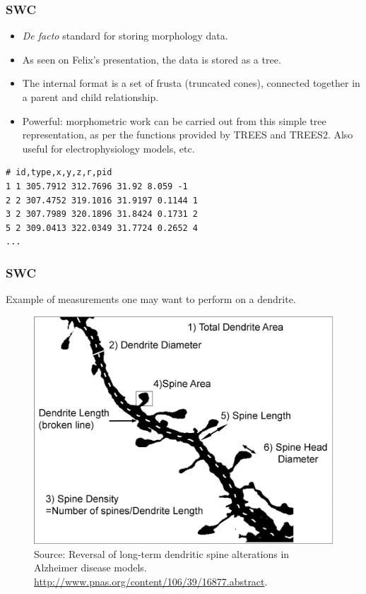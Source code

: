 \documentclass{beamer}
\begin{document}
\begin{frame}[fragile]
\frametitle{SWC}

\begin{itemize}

\item \emph{De facto} standard for storing morphology data.
\pause
\item As seen on Felix's presentation, the data is stored as a tree.
\pause
\item The internal format is a set of frusta (truncated cones),
  connected together in a parent and child relationship.
\pause
\item Powerful: morphometric work can be carried out from this simple
  tree representation, as per the functions provided by TREES and
  TREES2. Also useful for electrophysiology models, etc.
\pause
\end{itemize}

\begin{verbatim}
# id,type,x,y,z,r,pid
1 1 305.7912 312.7696 31.92 8.059 -1
2 2 307.4752 319.1016 31.9197 0.1144 1
3 2 307.7989 320.1896 31.8424 0.1731 2
5 2 309.0413 322.0349 31.7724 0.2652 4
...
\end{verbatim}
\end{frame}

\begin{frame}
\frametitle{SWC}

Example of measurements one may want to perform on a dendrite.

\begin{figure}[H]
    \centering
    \includegraphics[scale=0.1]{../blog/images/F1_large}
    \caption{Source: Reversal of long-term dendritic spine alterations in Alzheimer disease models.
      \url{http://www.pnas.org/content/106/39/16877.abstract}.}
    \label{fig:morphometry}
\end{figure}

\end{frame}
\end{document}

